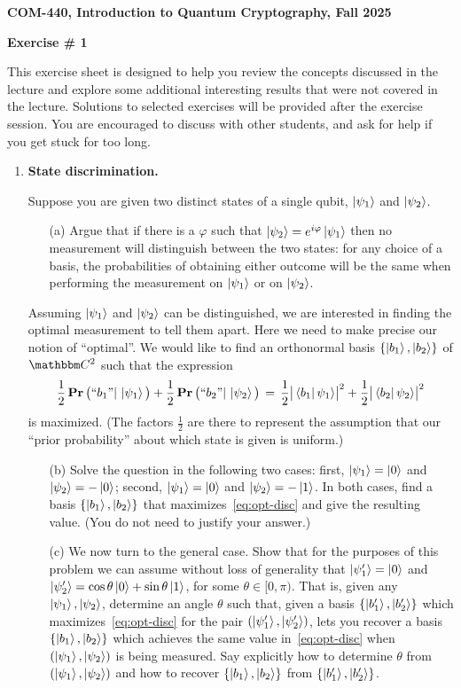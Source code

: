 \documentclass[12pt]{article}
\newcommand{\header}[1]{\begin{center} {\large\bf #1} \end{center}}
\begin{document}
\header{COM-440, Introduction to Quantum Cryptography, Fall 2025}
\header{\bf Exercise \# 1}

This exercise sheet is designed to help you review the concepts discussed in the lecture and explore some additional interesting results that were not covered in the lecture. Solutions to selected exercises will be provided after the exercise session. You are encouraged to discuss with other students, and ask for help if you get stuck for too long.

\begin{enumerate}
\item {\bf State discrimination.}

Suppose you are given two distinct states of a single qubit, $\ket{\psi_1}$ and $\ket{\psi_2}$. 
\begin{enumerate}
\item[(a)] Argue that if there is a $\varphi$ such that $\ket{\psi_2} = e^{i\varphi}\ket{\psi_1}$ then no measurement will distinguish between the two states: for any choice of a basis, the probabilities of obtaining either outcome will be the same when performing the measurement on $\ket{\psi_1}$ or on $\ket{\psi_2}$. 
\end{enumerate}
Assuming $\ket{\psi_1}$ and $\ket{\psi_2}$ can be distinguished, we are interested in finding the optimal measurement to tell them apart. Here we need to make precise our notion of ``optimal''. We would like to find an orthonormal basis $\{\ket{b_1},\ket{b_2}\}$ of $\C^2$ such that the expression 
\begin{equation}\label{eq:opt-disc}
\frac{1}{2}\mathop{\bf Pr\/}\big( ``b_1"|\,\ket{\psi_1}\big) + \frac{1}{2}\mathop{\bf Pr\/}\big(``b_2"|\,\ket{\psi_2}\big) \,=\,\frac{1}{2} \big|\bra{b_1}\psi_1\rangle\big|^2 + \frac{1}{2}\big|\bra{b_2}\psi_2\rangle\big|^2
\end{equation}
is maximized. (The factors $\frac{1}{2}$ are there to represent the assumption that our ``prior probability'' about which state is given is uniform.)
\begin{enumerate}[resume]
\item[(b)] Solve the question in the following two cases: first, $\ket{\psi_1}=\ket{0}$ and $\ket{\psi_2}=-\ket{0}$; second, $\ket{\psi_1}=\ket{0}$ and $\ket{\psi_2} = -\ket{1}$. In both cases, find a basis $\{\ket{b_1},\ket{b_2}\}$ that maximizes~\eqref{eq:opt-disc} and give the resulting value. (You do not need to justify your answer.)
\item[(c)] We now turn to the general case. Show that for the purposes of this problem we can assume without loss of generality that $\ket{\psi'_1}=\ket{0}$ and $\ket{\psi'_2} = \cos\theta\ket{0}+\sin\theta\ket{1}$, for some $\theta \in [0,\pi)$. That is, given any $\ket{\psi_1},\ket{\psi_2}$, determine an angle $\theta$ such that, given a basis $\{\ket{b'_1},\ket{b'_2}\}$ which maximizes~\eqref{eq:opt-disc} for the pair $(\ket{\psi'_1},\ket{\psi'_2})$, lets you recover a basis $\{\ket{b_1},\ket{b_2}\}$ which achieves the same value in~\eqref{eq:opt-disc} when $(\ket{\psi_1},\ket{\psi_2})$ is being measured. Say explicitly how to determine $\theta$ from $(\ket{\psi_1},\ket{\psi_2})$ and how to recover $\{\ket{b_1},\ket{b_2}\}$ from $\{\ket{b'_1},\ket{b'_2}\}$.

\end{enumerate}
\end{enumerate}
\end{document}
